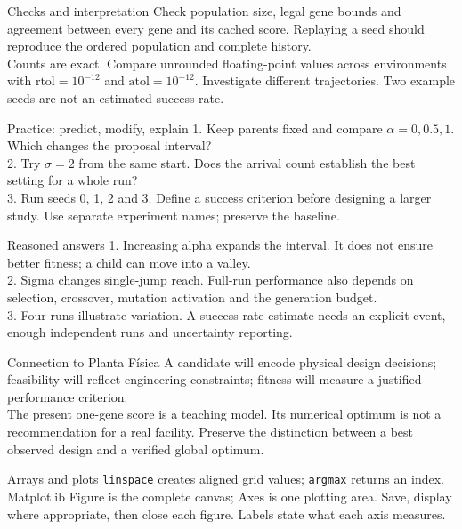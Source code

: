 \begin{frame}[fragile]{Checks and interpretation}
Check population size, legal gene bounds and agreement between every gene and its cached score. Replaying a seed should reproduce the ordered population and complete history.\\[0.7em]
Counts are exact. Compare unrounded floating-point values across environments with $\mathrm{rtol}=10^{-12}$ and $\mathrm{atol}=10^{-12}$. Investigate different trajectories. Two example seeds are not an estimated success rate.
\end{frame}

\begin{frame}[fragile]{Practice: predict, modify, explain}
1. Keep parents fixed and compare $\alpha=0,0.5,1$. Which changes the proposal interval?\\[0.6em]
2. Try $\sigma=2$ from the same start. Does the arrival count establish the best setting for a whole run?\\[0.6em]
3. Run seeds 0, 1, 2 and 3. Define a success criterion before designing a larger study. Use separate experiment names; preserve the baseline.
\end{frame}

\begin{frame}[fragile]{Reasoned answers}
1. Increasing alpha expands the interval. It does not ensure better fitness; a child can move into a valley.\\[0.6em]
2. Sigma changes single-jump reach. Full-run performance also depends on selection, crossover, mutation activation and the generation budget.\\[0.6em]
3. Four runs illustrate variation. A success-rate estimate needs an explicit event, enough independent runs and uncertainty reporting.
\end{frame}

\begin{frame}[fragile]{Connection to Planta Física}
A candidate will encode physical design decisions; feasibility will reflect engineering constraints; fitness will measure a justified performance criterion.\\[0.7em]
The present one-gene score is a teaching model. Its numerical optimum is not a recommendation for a real facility. Preserve the distinction between a best observed design and a verified global optimum.
\end{frame}

\begin{frame}[fragile]{Arrays and plots}
\texttt{linspace} creates aligned grid values; \texttt{argmax} returns an index. Matplotlib Figure is the complete canvas; Axes is one plotting area. Save, display where appropriate, then close each figure. Labels state what each axis measures.
\end{frame}

